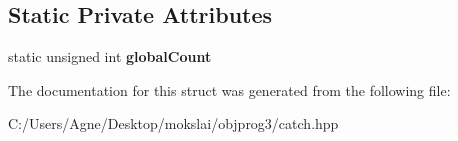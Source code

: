 \subsection*{Static Private Attributes}
\begin{DoxyCompactItemize}
\item 
\mbox{\label{struct_catch_1_1_message_info_a250459555d236f9510a5afd78a6c1979}} 
static unsigned int {\bfseries global\+Count}
\end{DoxyCompactItemize}


The documentation for this struct was generated from the following file\+:\begin{DoxyCompactItemize}
\item 
C\+:/\+Users/\+Agne/\+Desktop/mokslai/objprog3/catch.\+hpp\end{DoxyCompactItemize}

